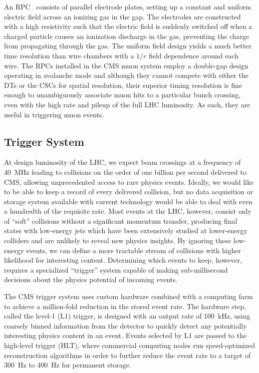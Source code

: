An RPC~\cite{Santonico1981377} consists of parallel electrode plates, setting up a constant and uniform electric field across an ionizing gas in the gap.  The electrodes are constructed with a high resistivity such that the electric field is suddenly switched off when a charged particle causes an ionization discharge in the gas, preventing the charge from propagating through the gas.  The uniform field design yields a much better time resolution than wire chambers with a $1/r$ field dependence around each wire.  The RPCs installed in the CMS muon system employ a double-gap design operating in avalanche mode and although they cannot compete with either the DTs or the CSCs for spatial resolution, their superior timing resolution is fine enough to unambiguously associate muon hits to a particular bunch crossing, even with the high rate and pileup of the full LHC luminosity.  As such, they are useful in triggering muon events.

\subsection{Trigger System}

At design luminosity of the LHC, we expect beam crossings at a frequency of \SI{40}{MHz} leading to collisions on the order of one billion per second delivered to CMS, allowing unprecedented access to rare physics events.  Ideally, we would like to be able to keep a record of every delivered collision, but no data acquisition or storage system available with current technology would be able to deal with even a hundredth of the requisite rate.  Most events at the LHC, however, consist only of ``soft'' collisions without a significant momentum transfer, producing final states with low-energy jets which have been extensively studied at lower-energy colliders and are unlikely to reveal new physics insights.  By ignoring these low-energy events, we can define a more tractable stream of collisions with higher likelihood for interesting content.  Determining which events to keep, however, requires a specialized ``trigger'' system capable of making sub-millisecond decisions about the physics potential of incoming events.

The CMS trigger system uses custom hardware combined with a computing farm to achieve a million-fold reduction in the stored event rate.  The hardware step, called the level-1 (L1) trigger, is designed with an output rate of \SI{100}{kHz}, using coarsely binned information from the detector to quickly detect any potentially interesting physics content in an event.  Events selected by L1 are passed to the high-level trigger (HLT), where commercial computing nodes run speed-optimized reconstruction algorithms in order to further reduce the event rate to a target of \SI{300}{Hz} to \SI{400}{Hz} for permanent storage.

